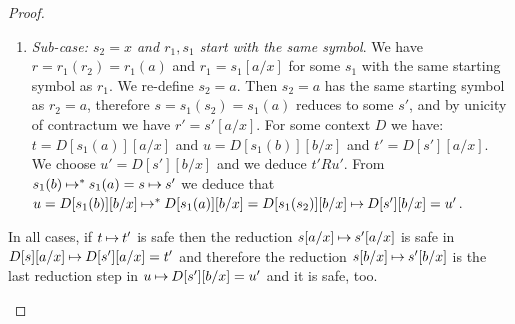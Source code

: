 \begin{proof}
\begin{enumerate}
\begin{enumerate}
\item
\emph{Sub-case: $s_2=x$ and $r_1,s_1$ start with the same symbol}. 
We have $r = r_1(r_2) = r_1(a)$ and
$r_1 = s_1[a/x]$ for some $s_1$ with the same starting symbol as $r_1$.
We re-define $s_2=a$. Then $s_2=a$ has the same starting symbol as $r_2=a$,
therefore $ s = s_1(s_2) = s_1(a)$ reduces to some $s'$, 
and by unicity of contractum we have $r' = s'[a/x]$.
For some context $D$ we have: 
$ t  = D[s_1(a)][a/x]$ and 
$ u = D[s_1(b)][b/x]$ and
$ t' = D[s'][a/x]$. 
We choose $u' = D[s'][b/x]$ 
and we deduce $t' R u'$. 
From $s_1(b) \mathbin{\mapsto}^{*} s_1(a) = s \mathbin{\mapsto}   s'$
we deduce that $u = D[s_1(b)][b/x] \mathbin{\mapsto}^{*} D[s_1(a)][b/x] 
= D[s_1(s_2)][b/x] 
\mathbin{\mapsto} D[s'][b/x] = u'$.
\end{enumerate}

In all cases, if $t \mathbin{\mapsto}   t'$ is safe then the reduction $s[a/x] \mathbin{\mapsto}   s'[a/x]$ 
is safe in $D[s][a/x] \mathbin{\mapsto}  D[s'][a/x] = t'$
and therefore the reduction $s[b/x] \mathbin{\mapsto}   s'[b/x]$
is the last reduction step in  $u \mathbin{\mapsto}   D[s'][b/x] = u'$ and it is
safe, too.
\end{enumerate}
\end{proof}


